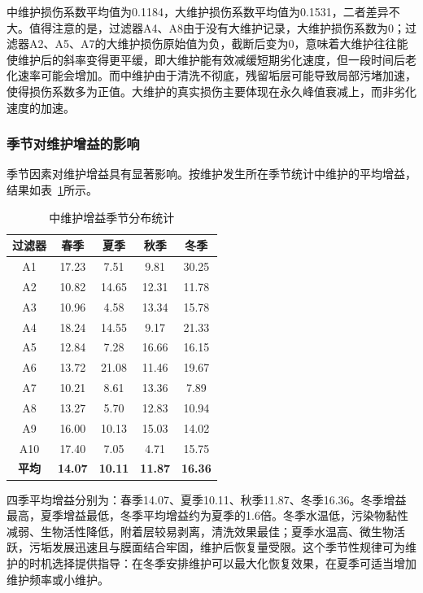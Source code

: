 \documentclass[withoutpreface,bwprint]{cumcmthesis}
\begin{document}
中维护损伤系数平均值为0.1184，大维护损伤系数平均值为0.1531，二者差异不大。值得注意的是，过滤器A4、A8由于没有大维护记录，大维护损伤系数为0；过滤器A2、A5、A7的大维护损伤原始值为负，截断后变为0，意味着大维护往往能使维护后的斜率变得更平缓，即大维护能有效减缓短期劣化速度，但一段时间后老化速率可能会增加。而中维护由于清洗不彻底，残留垢层可能导致局部污堵加速，使得损伤系数多为正值。大维护的真实损伤主要体现在永久峰值衰减上，而非劣化速度的加速。

\subsubsection{季节对维护增益的影响}

季节因素对维护增益具有显著影响。按维护发生所在季节统计中维护的平均增益，结果如表~\ref{tab:中维护季节}所示。

\begin{table}[H]
	\centering
	\setlength{\tabcolsep}{10pt}
	\renewcommand{\arraystretch}{1.2}
	\caption{中维护增益季节分布统计}
	\label{tab:中维护季节}
	\begin{tabular}{ccccc}
		\toprule
		\textbf{过滤器} & \textbf{春季} & \textbf{夏季} & \textbf{秋季} & \textbf{冬季} \\
		\midrule
		\rowcolor{LightBlue}
		A1 & 17.23 & 7.51 & 9.81 & 30.25 \\
		A2 & 10.82 & 14.65 & 12.31 & 11.78 \\
		\rowcolor{LightBlue}
		A3 & 10.96 & 4.58 & 13.34 & 15.78 \\
		A4 & 18.24 & 14.55 & 9.17 & 21.33 \\
		\rowcolor{LightBlue}
		A5 & 12.84 & 7.28 & 16.66 & 16.15 \\
		A6 & 13.72 & 21.08 & 11.46 & 19.67 \\
		\rowcolor{LightBlue}
		A7 & 10.21 & 8.61 & 13.36 & 7.89 \\
		A8 & 13.27 & 5.70 & 12.83 & 10.94 \\
		\rowcolor{LightBlue}
		A9 & 16.00 & 10.13 & 15.03 & 14.02 \\
		A10 & 17.40 & 7.05 & 4.71 & 15.75 \\
		\midrule
		\textbf{平均} & \textbf{14.07} & \textbf{10.11} & \textbf{11.87} & \textbf{16.36} \\
		\bottomrule
	\end{tabular}
\end{table}

四季平均增益分别为：春季14.07、夏季10.11、秋季11.87、冬季16.36。冬季增益最高，夏季增益最低，冬季平均增益约为夏季的1.6倍。冬季水温低，污染物黏性减弱、生物活性降低，附着层较易剥离，清洗效果最佳；夏季水温高、微生物活跃，污垢发展迅速且与膜面结合牢固，维护后恢复量受限。这个季节性规律可为维护的时机选择提供指导：在冬季安排维护可以最大化恢复效果，在夏季可适当增加维护频率或小维护。
\end{document}

